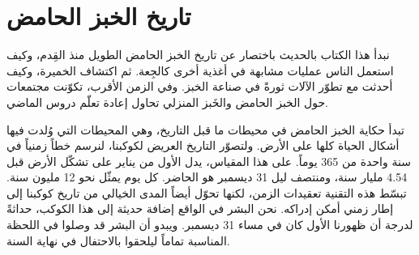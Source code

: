%
%
%

\chapter{تاريخ الخبز الحامض}%
\label{ch:history}
\begin{quoting}
    نبدأ هذا الكتاب بالحديث باختصار عن تاريخ الخبز الحامض الطويل منذ القِدم، وكيف استعمل الناس عمليات مشابهة في أغذية أخرى كالجِعة. ثم اكتشاف الخميرة، وكيف أحدثت مع تطوّر الآلات ثورةً في صناعة الخبز. وفي الزمن الأقرب، تكوّنت مجتمعات حول الخبز الحامض والخَبز المنزلي تحاول إعادة تعلّم دروس الماضي.
\end{quoting}

تبدأ حكاية الخبز الحامض في محيطات ما قبل التاريخ، وهي المحيطات التي وُلدت فيها أشكال الحياة كلها على الأرض. ولتصوّر التاريخ العريض لكوكبنا، لنرسم خطاً زمنياً في سنة واحدة من 365 يوماً. على هذا المقياس، يدل الأول من يناير على تشكّل الأرض قبل 4.54 مليار سنة، ومنتصف ليل 31 ديسمبر هو الحاضر. كل يوم يمثّل نحو 12 مليون سنة. تبسّط هذه التقنية تعقيدات الزمن، لكنها تحوّل أيضاً المدى الخيالي من تاريخ كوكبنا إلى إطار زمني أمكن إدراكه. نحن البشر في الواقع إضافة حديثة إلى هذا الكوكب، حداثةً لدرجة أن ظهورنا الأول كان في مساء 31 ديسمبر. ويبدو أن البشر قد وصلوا في اللحظة المناسبة تماماً ليلحقوا بالاحتفال في نهاية السنة.

